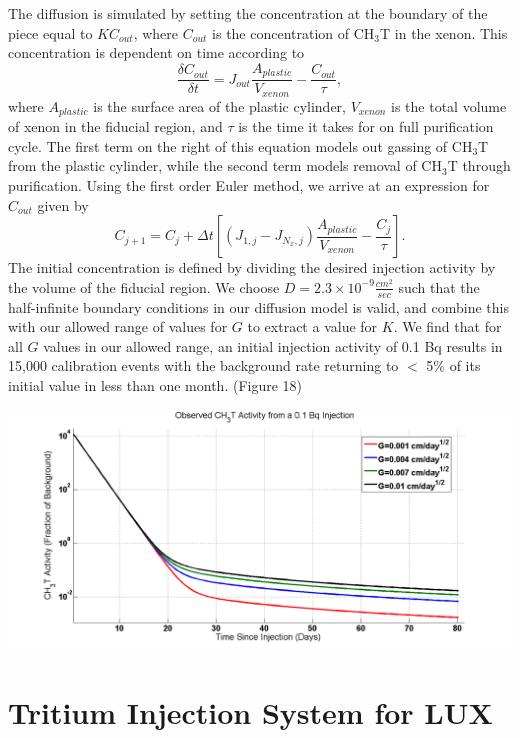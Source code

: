 \documentclass[a4paper,12pt]{article}
\begin{document}
The diffusion is simulated by setting the concentration at the boundary of the piece equal to $KC_{out}$, where $C_{out}$ is the concentration of CH$_3$T in the xenon.  This concentration is dependent on time according to
\[\frac{\delta C_{out}}{\delta t} = J_{out} \frac{A_{plastic}}{V_{xenon}}-\frac{C_{out}}{\tau},\]
where $A_{plastic}$ is the surface area of the plastic cylinder, $V_{xenon}$ is the total volume of xenon in the fiducial region, and $\tau$ is the time it takes for on full purification cycle.  The first term on the right of this equation models out gassing of CH$_3$T from the plastic cylinder, while the second term models removal of CH$_3$T through purification.  Using the first order Euler method, we arrive at an expression for $C_{out}$ given by
\[C_{j+1}=C_j + \Delta t [(J_{1,j}-J_{N_x,j})\frac{A_{plastic}}{V_{xenon}}-\frac{C_j}{\tau}].\]
The initial concentration is defined by dividing the desired injection activity by the volume of the fiducial region.  We choose $D = 2.3 \times 10^{-9} \frac {cm^2}{sec}$ such that the half-infinite boundary conditions in our diffusion model is valid, and combine this with our allowed range of values for $G$ to extract a value for $K$.  We find that for all $G$ values in our allowed range, an initial injection activity of 0.1 Bq results in 15,000 calibration events with the background rate returning to $<$ 5\% of its initial value in less than one month. (Figure 18)

\begin{center}
\includegraphics[scale=0.35]{LUXActivityOverTime.png}
\end{center}

\section{Tritium Injection System for LUX}
\end{document}
